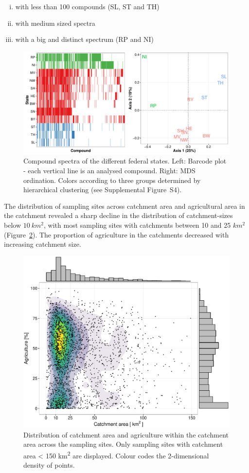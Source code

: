 \documentclass[journal=esthag,manuscript=article]{achemso}
\begin{document}
\begin{enumerate}[i)]
	\item with less than 100 compounds (SL, ST and TH)
	\item with medium sized spectra
	\item with a big and distinct spectrum (RP and NI)
\end{enumerate}

\begin{figure}[ht]
  \includegraphics[width=\textwidth]{figure2.pdf}
  \caption{Compound spectra of the different federal states. Left: Barcode plot - each vertical line is an analysed compound. Right: MDS ordination. 
  Colors according to three groups determined by hierarchical clustering (see Supplemental Figure~S4).}
  \label{fig:fig2}
\end{figure}

The distribution of sampling sites across catchment area and agricultural area in the catchment revealed a sharp decline in the distribution of catchment-sizes below $10~km^2$, with most sampling sites with catchments between 10 and 25 $km^2$ (Figure~\ref{fig:fig3}).
The proportion of agriculture in the catchments decreased with increasing catchment size.

\begin{figure}[ht]
  \includegraphics[width=.8\textwidth]{figure3.pdf}
  \caption{Distribution of catchment area and agriculture within the catchment area across the sampling sites.
  Only sampling sites with catchment area < 150 km\textsuperscript{2} are displayed. 
  Colour codes the 2-dimensional density of points.}
  \label{fig:fig3}
\end{figure}
\end{document}
